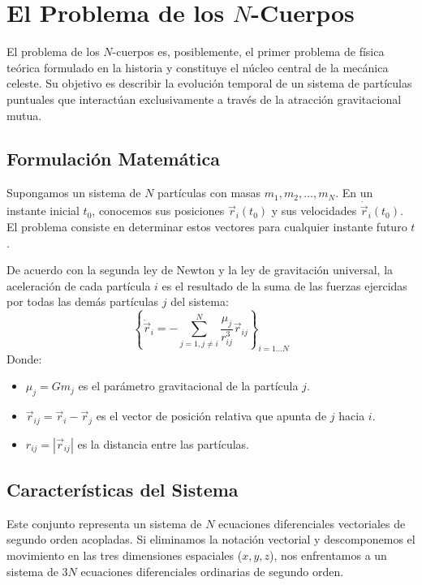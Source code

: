 \documentclass[a4paper]{article}
\begin{document}
\section{El Problema de los $N$-Cuerpos}

El problema de los $N$-cuerpos es, posiblemente, el primer problema de física teórica formulado en la historia y constituye el núcleo central de la mecánica celeste. Su objetivo es describir la evolución temporal de un sistema de partículas puntuales que interactúan exclusivamente a través de la atracción gravitacional mutua.

\subsection{Formulación Matemática}
Supongamos un sistema de $N$ partículas con masas $m_1, m_2, ..., m_N$. En un instante inicial $t_0$, conocemos sus posiciones $\vec{r}_i(t_0)$ y sus velocidades $\dot{\vec{r}}_i(t_0)$. El problema consiste en determinar estos vectores para cualquier instante futuro $t$.

De acuerdo con la segunda ley de Newton y la ley de gravitación universal, la aceleración de cada partícula $i$ es el resultado de la suma de las fuerzas ejercidas por todas las demás partículas $j$ del sistema:
\begin{equation}
    \left\{ \ddot{\vec{r}}_i = -\sum_{j=1, j \neq i}^{N} \frac{\mu_j}{r_{ij}^3} \vec{r}_{ij} \right\}_{i=1...N}
\end{equation}
Donde:
\begin{itemize}
    \item $\mu_j = Gm_j$ es el parámetro gravitacional de la partícula $j$.
    \item $\vec{r}_{ij} = \vec{r}_i - \vec{r}_j$ es el vector de posición relativa que apunta de $j$ hacia $i$.
    \item $r_{ij} = |\vec{r}_{ij}|$ es la distancia entre las partículas.
\end{itemize}

\subsection{Características del Sistema}
Este conjunto representa un sistema de $N$ ecuaciones diferenciales vectoriales de segundo orden acopladas. Si eliminamos la notación vectorial y descomponemos el movimiento en las tres dimensiones espaciales ($x, y, z$), nos enfrentamos a un sistema de $3N$ ecuaciones diferenciales ordinarias de segundo orden.
\end{document}
